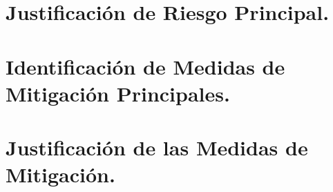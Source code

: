 \documentclass[letterpaper,12pt]{article} %
\numberwithin{equation}{section} %
\numberwithin{figure}{section} %
\numberwithin{table}{section} %
\begin{document}
\newpage
\section{Justificaci\'on de Riesgo Principal.}

\newpage
\section{Identificaci\'on de Medidas de Mitigaci\'on Principales.}

\newpage
\section{Justificaci\'on de las Medidas de Mitigaci\'on.}
\end{document}
